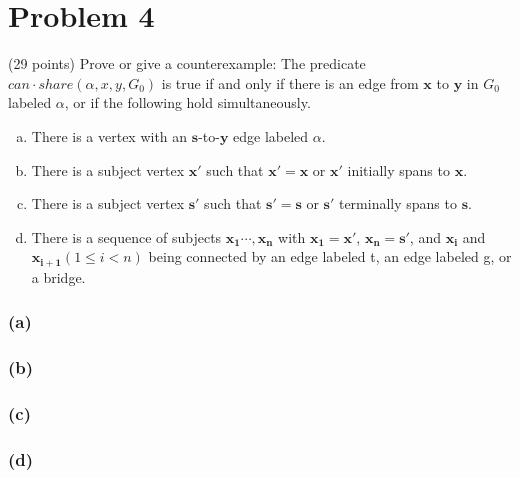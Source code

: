 \section*{Problem 4}
(29 points) Prove or give a counterexample:
The predicate $can\cdot share(\alpha, x, y, G_0)$ is true if and only if there is an edge from $\mathbf{x}$ to $\mathbf{y}$ in $G_0$ labeled $\alpha$, or if the following hold simultaneously.
\begin{enumerate}[(a)]
    \item There is a vertex with an $\mathbf{s}$-to-$\mathbf{y}$ edge labeled $\alpha$.
    \item There is a subject vertex $\mathbf{x'}$ such that $\mathbf{x'} = \mathbf{x}$ or $\mathbf{x'}$ initially spans to $\mathbf{x}$.
    \item There is a subject vertex $\mathbf{s'}$ such that $\mathbf{s'} = \mathbf{s}$ or $\mathbf{s'}$ terminally spans to $\mathbf{s}$.
    \item There is a sequence of subjects $\mathbf{x_1} \cdots, \mathbf{x_n}$ with $\mathbf{x_1} = \mathbf{x'}$, $\mathbf{x_n} = \mathbf{s'}$, and $\mathbf{x_i}$ and $\mathbf{x_{i+1}} (1 \le i < n)$ being connected by an edge labeled t, an edge labeled g, or a bridge.
\end{enumerate}

\subsubsection*{(a)}
\subsubsection*{(b)}
\subsubsection*{(c)}
\subsubsection*{(d)}



